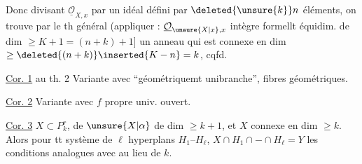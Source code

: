 
Donc divisant $\underline{\mathcal O}_{X,x}$ par un idéal défini par $\deleted{\unsure{k}}n$ éléments, on  trouve par le th général  (appliquer : $\underline{\mathcal O}_{\unsure{X|x},x}$ intègre formellt équidim. de dim $\geq K+1=(n+k)+1$] un anneau qui est connexe en dim $\geq\deleted{(n+k)}\inserted{K-n}=k$, cqfd.

\uline{Cor. 1} au th. 2 Variante avec  ``géométriquemt  unibranche'', \unsure{*}  fibres géométriques.

\uline{Cor. 2} Variante avec $f$ propre univ. ouvert.

\uline{Cor. 3} $X\subset P^r_k$,   de $\unsure{X|\alpha}$ de dim $\geq k+1$, et $X$ connexe en dim $\geq k$. Alors pour tt système de $\ell$ hyperplans $H_1\text{--}H_\ell$,   $X\cap H_1\cap-\cap H_\ell=Y$  les conditions analogues avec  au lieu de $k$.

